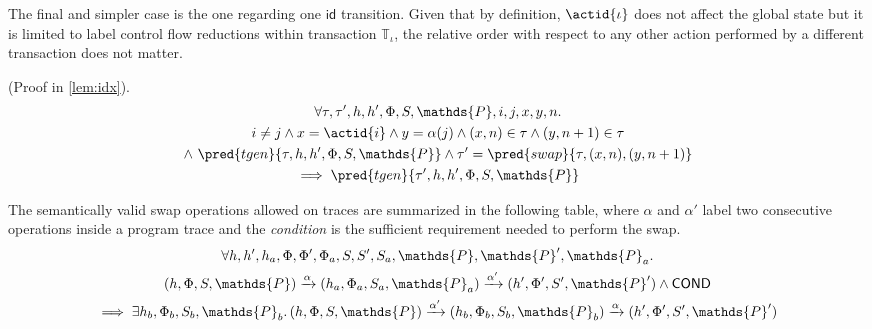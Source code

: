 The final and simpler case is the one regarding one $\mathsf{id}$ transition. Given that by definition, $\actid{\iota}$ does not affect the global state but it is limited to label control flow reductions within transaction $\mathds{T}_\iota$, the relative order with respect to any other action performed by a different transaction does not matter.
\begin{lem}
	(Proof in \ref{lem:idx}).
	\begin{gather*}
		\forall \tau, \tau', h, h', \Phi, S, \mathds{P}, i, j, x, y, n \ldotp \\
			i \neq j \land x = \actid{i} \land y = \alpha(j) \land (x, n) \in \tau \land (y, n+1) \in \tau \\ \land\ \pred{tgen}{\tau, h, h', \Phi, S, \mathds{P}} \land \tau' = \pred{swap}{\tau, (x, n), (y, n+1)}
			\\	 
		 \implies \pred{tgen}{\tau', h, h', \Phi, S, \mathds{P}}
	\end{gather*}
\end{lem}

The semantically valid swap operations allowed on traces are summarized in the following table, where $\alpha$ and $\alpha'$ label two consecutive operations inside a program trace and the \textit{condition} is the sufficient requirement needed to perform the swap.
\begin{gather*}
	\forall h, h', h_a, \Phi, \Phi', \Phi_a, S, S', S_a, \mathds{P}, \mathds{P}', \mathds{P}_a \ldotp \\
	(h, \Phi, S, \mathds{P})
		\xrightarrow{\alpha}
	(h_a, \Phi_a, S_a, \mathds{P}_a)
		\xrightarrow{\alpha'}
	(h', \Phi', S', \mathds{P}') \land \mathsf{COND} \\
		\implies
	\exists h_b, \Phi_b, S_b, \mathds{P}_b \ldotp
	(h, \Phi, S, \mathds{P})
		\xrightarrow{\alpha'}
	(h_b, \Phi_b, S_b, \mathds{P}_b)
		\xrightarrow{\alpha}
	(h', \Phi', S', \mathds{P}')
\end{gather*}

